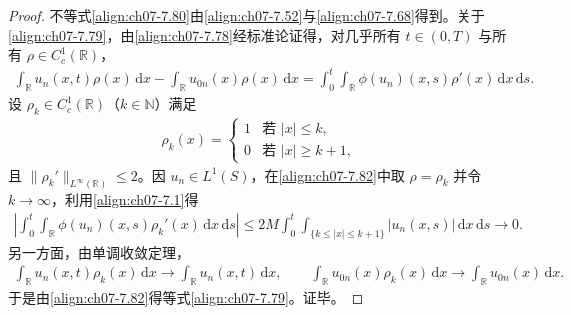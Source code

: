 ﻿\documentclass[../../main.tex]{subfiles}%
\begin{document}
\begin{proof}
不等式\eqref{align:ch07-7.80}由\eqref{align:ch07-7.52}与\eqref{align:ch07-7.68}得到。关于\eqref{align:ch07-7.79}，由\eqref{align:ch07-7.78}经标准论证得，对几乎所有 $t\in(0,T)$ 与所有 $\rho\in C^1_c(\mathbb{R})$，
\begin{align}
\int_{\mathbb{R}}u_n(x,t)\rho(x)\,\mathrm{d}x-\int_{\mathbb{R}}u_{0n}(x)\rho(x)\,\mathrm{d}x
=\int_0^t\int_{\mathbb{R}}\phi(u_n)(x,s)\rho'(x)\,\mathrm{d}x\,\mathrm{d}s. \label{align:ch07-7.82}
\end{align}
设 $\rho_k\in C^1_c(\mathbb{R})$（$k\in\mathbb{N}$）满足
\begin{align*}
\rho_k(x)=\begin{cases}1&\text{若 }|x|\leqslant k,\\0&\text{若 }|x|\geqslant k+1,\end{cases}
\end{align*}
且 $\|\rho_k'\|_{L^\infty(\mathbb{R})}\leqslant2$。因 $u_n\in L^1(S)$，在\eqref{align:ch07-7.82}中取 $\rho=\rho_k$ 并令 $k\to\infty$，利用\eqref{align:ch07-7.1}得
\begin{align*}
\left|\int_0^t\int_{\mathbb{R}}\phi(u_n)(x,s)\rho_k'(x)\,\mathrm{d}x\,\mathrm{d}s\right|
\leqslant2M\int_0^t\int_{\{k\leqslant|x|\leqslant k+1\}}|u_n(x,s)|\,\mathrm{d}x\,\mathrm{d}s\to0.
\end{align*}
另一方面，由单调收敛定理，
\begin{align*}
\int_{\mathbb{R}}u_n(x,t)\rho_k(x)\,\mathrm{d}x\to\int_{\mathbb{R}}u_n(x,t)\,\mathrm{d}x,\qquad
\int_{\mathbb{R}}u_{0n}(x)\rho_k(x)\,\mathrm{d}x\to\int_{\mathbb{R}}u_{0n}(x)\,\mathrm{d}x.
\end{align*}
于是由\eqref{align:ch07-7.82}得等式\eqref{align:ch07-7.79}。证毕。
\end{proof}
\end{document}
